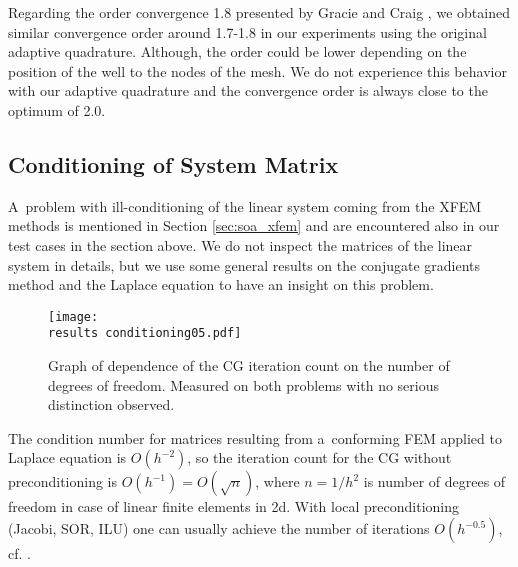 Regarding the order convergence 1.8 presented by Gracie and Craig \cite{gracie_modelling_2010}, we obtained similar convergence order 
around 1.7-1.8 in our experiments using the original adaptive quadrature. Although, the order could be lower 
depending on the position of the well to the nodes of the mesh. We do not experience this behavior with our adaptive
quadrature and the convergence order is always close to the optimum of 2.0.




\subsection{Conditioning of System Matrix} \label{sec:res_conditioning}
A~problem with ill-conditioning of the linear system coming from the XFEM methods is mentioned in Section \ref{sec:soa_xfem}
and are encountered also in our test cases in the section above. We do not inspect the matrices of the linear system in details, 
but we use some general results on the conjugate gradients method and the Laplace equation to have an insight on this problem.

\begin{figure}[!htb]
  \centering    
    \texttt{[image: \\results conditioning05.pdf]}
  \caption[CG iterations count in Test case 3]{Graph of dependence of the CG iteration count on the 
  number of degrees of freedom. Measured on both problems with no serious distinction observed.}
  \label{fig:conditioning05}
\end{figure}
%

The condition number for matrices resulting from a~conforming FEM applied to Laplace equation is $O(h^{-2})$, so the iteration count 
for the CG without preconditioning is $O(h^{-1})=O(\sqrt{n})$, where $n=1/h^2$ is number of degrees of freedom in case of linear finite elements in 2d. 
With local preconditioning (Jacobi, SOR, ILU) one can usually achieve the number of iterations $O(h^{-0.5})$, cf. \cite{ern_evaluation_2006}.


